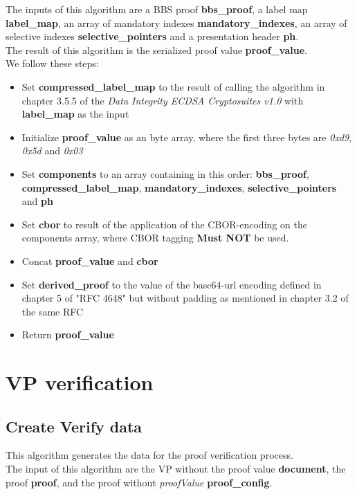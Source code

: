 \documentclass[
	a4paper               %
	,bibliography=totoc   %
	,listof=totoc         %
	,monolingual
]{bfhthesis}              %
\begin{document}
The inputs of this algorithm are a BBS proof \textbf{bbs\_proof}, a label map \textbf{label\_map}, an array of mandatory indexes \textbf{mandatory\_indexes}, an array of selective indexes \textbf{selective\_pointers} and a presentation header \textbf{ph}.\\

The result of this algorithm is the serialized proof value \textbf{proof\_value}.\\

We follow these steps:
\begin{itemize}
	\item Set \textbf{compressed\_label\_map} to the result of calling the algorithm in chapter 3.5.5 of the \textit{Data Integrity ECDSA Cryptosuites v1.0}\cite{ecdsa} with \textbf{label\_map} as the input
	\item Initialize \textbf{proof\_value} as an byte array, where the first three bytes are \textit{0xd9}, \textit{0x5d} and \textit{0x03}
	\item Set \textbf{components} to an array containing in this order: \textbf{bbs\_proof}, \textbf{compressed\_label\_map}, \textbf{mandatory\_indexes}, \textbf{selective\_pointers} and \textbf{ph}
	\item Set \textbf{cbor} to result of the application of the CBOR-encoding\cite{cbor} on the components array, where CBOR tagging \textbf{Must NOT} be used.
	\item Concat \textbf{proof\_value} and \textbf{cbor}
	\item Set \textbf{derived\_proof} to the value of the base64-url encoding defined in chapter 5 of "RFC 4648"\cite{base64} but without padding as mentioned in chapter 3.2 of the same RFC
	\item Return \textbf{proof\_value}
\end{itemize}


\chapter{VP verification}

\section{Create Verify data}
\label{subsub:createverifydata}
This algorithm generates the data for the proof verification process.\\

The input of this algorithm are the VP without the proof value \textbf{document}, the proof \textbf{proof}, and the proof without \textit{proofValue} \textbf{proof\_config}.\\
\end{document}
